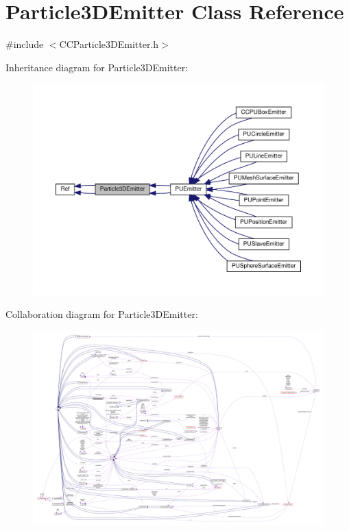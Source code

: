 \hypertarget{classParticle3DEmitter}{}\section{Particle3\+D\+Emitter Class Reference}
\label{classParticle3DEmitter}


{\ttfamily \#include $<$C\+C\+Particle3\+D\+Emitter.\+h$>$}



Inheritance diagram for Particle3\+D\+Emitter\+:
\nopagebreak
\begin{figure}[H]
\begin{center}
\leavevmode
\includegraphics[width=350pt]{classParticle3DEmitter__inherit__graph}
\end{center}
\end{figure}


Collaboration diagram for Particle3\+D\+Emitter\+:
\nopagebreak
\begin{figure}[H]
\begin{center}
\leavevmode
\includegraphics[width=350pt]{classParticle3DEmitter__coll__graph}
\end{center}
\end{figure}
